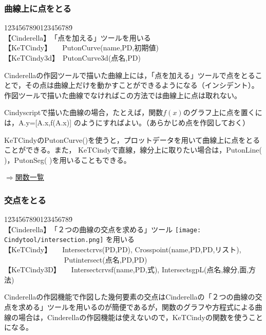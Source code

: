 \documentclass[papersize,a4paper,12pt,uplatex]{jsarticle}
\begin{document}
\subsubsection{曲線上に点をとる}

\begin{tabbing}
12\=34567890123456789\=\kill\\

\>【Cinderella】　\>「点を加える」ツールを用いる\\ 
\>【KeTCindy】　　\>PutonCurve(name,PD,初期値)\\
\>【KeTCindy3d】　\>PutonCurve3d(点名,PD)\\
\end{tabbing}

Cinderellaの作図ツールで描いた曲線上には，「点を加える」ツールで点をとることで，その点は曲線上だけを動かすことができるようになる（インシデント）。作図ツールで描いた曲線でなければこの方法では曲線上に点は取れない。

Cindyscriptで描いた曲線の場合，たとえば，関数$f(x)$のグラフ上に点を置くには，A.y=[A.x,f(A.x)] のようにすればよい。（あらかじめ点を作図しておく）

KeTCindyのPutonCurve()を使うと，プロットデータを用いて曲線上に点をとることができる。また，
KeTCindyで直線，線分上に取りたい場合は，PutonLine( )，PutonSeg( )を用いることもできる。\\
\begin{flushright} \hyperlink{functionlist3d}{$\Rightarrow$関数一覧}\end{flushright}
 
\subsubsection{交点をとる}
\begin{tabbing}
12\=34567890123456789\=\kill\\

\>【Cinderella】　\>「２つの曲線の交点を求める」ツール \texttt{[image: Cindytool/intersection.png]} を用いる\\ 
 \>【KeTCindy】　　\>Intersectcrvs(PD,PD), Crosspoint(name,PD,PD,リスト),\\
  \>　　　　　　　　\> Putintersect(点名,PD,PD)\\
 \>【KeTCindy3D】　　\>Intersectcrvsf(name,PD,式), IntersectsgpL(点名,線分,面,方法)\\
\end{tabbing}

Cinderellaの作図機能で作図した幾何要素の交点はCinderellaの「２つの曲線の交点を求める」ツールを用いるのが簡便であるが，関数のグラフや方程式による曲線の場合は，Cinderellaの作図機能は使えないので，KeTCindyの関数を使うことになる。
\end{document}

